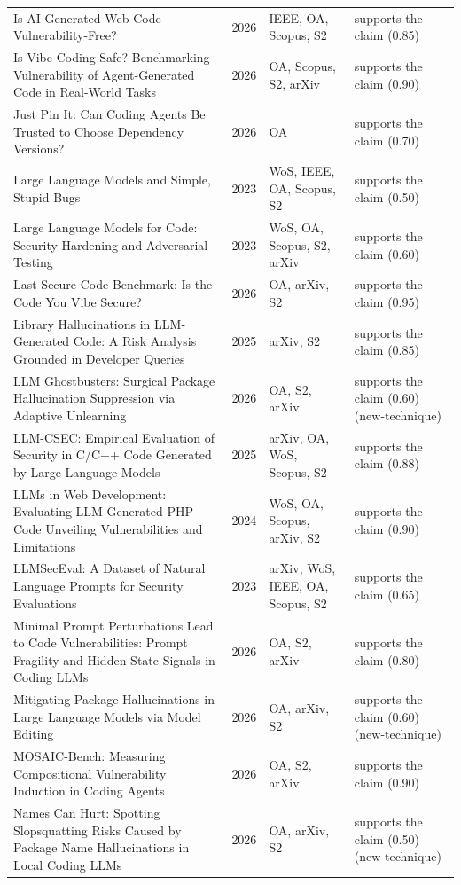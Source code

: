 \begin{longtable}{@{}%
  >{\raggedright\arraybackslash}p{}c%
  >{\raggedright\arraybackslash}p{}%
  >{\raggedright\arraybackslash}p{}@{}}
Is AI-Generated Web Code Vulnerability-Free? & 2026 & IEEE, OA, Scopus, S2 & supports the claim (0.85) \\
Is Vibe Coding Safe? Benchmarking Vulnerability of Agent-Generated Code in Real-World Tasks & 2026 & OA, Scopus, S2, arXiv & supports the claim (0.90) \\
Just Pin It: Can Coding Agents Be Trusted to Choose Dependency Versions? & 2026 & OA & supports the claim (0.70) \\
Large Language Models and Simple, Stupid Bugs & 2023 & WoS, IEEE, OA, Scopus, S2 & supports the claim (0.50) \\
Large Language Models for Code: Security Hardening and Adversarial Testing & 2023 & WoS, OA, Scopus, S2, arXiv & supports the claim (0.60) \\
Last Secure Code Benchmark: Is the Code You Vibe Secure? & 2026 & OA, arXiv, S2 & supports the claim (0.95) \\
Library Hallucinations in LLM-Generated Code: A Risk Analysis Grounded in Developer Queries & 2025 & arXiv, S2 & supports the claim (0.85) \\
LLM Ghostbusters: Surgical Package Hallucination Suppression via Adaptive Unlearning & 2026 & OA, S2, arXiv & supports the claim (0.60) (new-technique) \\
LLM-CSEC: Empirical Evaluation of Security in C/C++ Code Generated by Large Language Models & 2025 & arXiv, OA, WoS, Scopus, S2 & supports the claim (0.88) \\
LLMs in Web Development: Evaluating LLM-Generated PHP Code Unveiling Vulnerabilities and Limitations & 2024 & WoS, OA, Scopus, arXiv, S2 & supports the claim (0.90) \\
LLMSecEval: A Dataset of Natural Language Prompts for Security Evaluations & 2023 & arXiv, WoS, IEEE, OA, Scopus, S2 & supports the claim (0.65) \\
Minimal Prompt Perturbations Lead to Code Vulnerabilities: Prompt Fragility and Hidden-State Signals in Coding LLMs & 2026 & OA, S2, arXiv & supports the claim (0.80) \\
Mitigating Package Hallucinations in Large Language Models via Model Editing & 2026 & OA, arXiv, S2 & supports the claim (0.60) (new-technique) \\
MOSAIC-Bench: Measuring Compositional Vulnerability Induction in Coding Agents & 2026 & OA, S2, arXiv & supports the claim (0.90) \\
Names Can Hurt: Spotting Slopsquatting Risks Caused by Package Name Hallucinations in Local Coding LLMs & 2026 & OA, arXiv, S2 & supports the claim (0.50) (new-technique) \\

\end{longtable}
